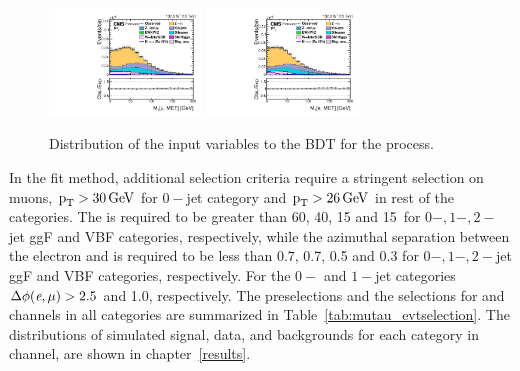 \begin{figure}[htbp!]
  \includegraphics[width=0.36\textwidth]{plots/chapter6/mue/MTMuMET.pdf}
  \includegraphics[width=0.36\textwidth]{plots/chapter6/mue/MTEMET.pdf}\\
  \caption{Distribution of the input variables to the BDT for the \mue process.}
  \label{fig:input_me}
\end{figure}

In the \mcol fit method, additional selection criteria require a stringent selection on muons, $\text{p}_\text{T} > 30 \,\text{Ge\hspace{-.08em}V}$ for $0-$jet category and $\text{p}_\text{T} > 26 \,\text{Ge\hspace{-.08em}V}$ in rest of the categories. The \mtmmet is required to be greater than 60, 40, 15 and 15~\GeV for $0-, 1-, 2-$jet ggF and VBF categories, respectively, while the azimuthal separation between the electron and \ptvecmiss is required to be less than 0.7, 0.7, 0.5 and 0.3 for $0-, 1-, 2-$jet ggF and VBF categories, respectively. For the $0-$ and $1-$jet categories $\Delta\phi(\textit{e},\mu) > 2.5$ and 1.0, respectively. The preselections and the selections for \muhad and \mue channels in all categories are summarized in Table~\ref{tab:mutau_evtselection}. The \mcol distributions of simulated signal, data, and backgrounds for each category in \mue channel, are shown in chapter~\ref{results}.

